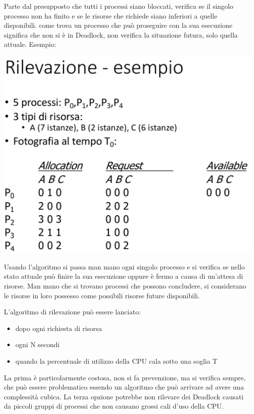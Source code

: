 \documentclass[a4paper, 12pt]{book}
\begin{document}
 Parte dal presupposto che tutti i processi siano bloccati,
 verifica se il singolo processo non ha finito e se le risorse che richiede siano inferiori a quelle disponibili.
  come trova un processo che può proseguire
  con la sua esecuzione significa che non si è in Deadlock, non verifica la situazione futura, solo quella attuale.
Esempio:
\begin{center}
    \includegraphics[width=1\textwidth]{detection2.png}
\end{center}
Usando l'algoritmo si passa man mano ogni singolo processo e si verifica se nello stato attuale può finire la sua esecuzione
 oppure è fermo a causa di un'attesa di risorse. Man mano che si trovano processi che possono concludere, si considerano 
 le risorse in loro possesso come possibili risorse future disponibili.

 L'algoritmo di rilevazione può essere lanciato:
 \begin{itemize}
     \item dopo ogni richiesta di risorsa
     \item ogni N secondi
     \item quando la percentuale di utilizzo della CPU cala sotto una soglia T
 \end{itemize}
 La prima è particolarmente costosa, non si fa prevenzione, ma si verifica sempre, che può essere problematico essendo 
 un algoritmo che può arrivare ad avere una complessità cubica. La terza opzione potrebbe non rilevare dei Deadlock causati da 
 piccoli gruppi di processi che non causano grossi cali d'uso della CPU.
\end{document}
